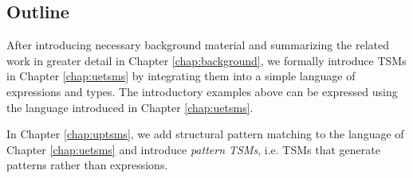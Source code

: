 

\subsection{Outline}

After introducing necessary background material and summarizing the related work in greater detail in Chapter \ref{chap:background}, we formally introduce TSMs in Chapter \ref{chap:uetsms} by integrating them into a simple language of expressions and types. The introductory examples above can be expressed using the language introduced in Chapter \ref{chap:uetsms}. 


In Chapter \ref{chap:uptsms}, we add structural pattern matching to the language of Chapter \ref{chap:uetsms} and introduce \emph{pattern TSMs}, i.e. TSMs that generate patterns rather than expressions.


